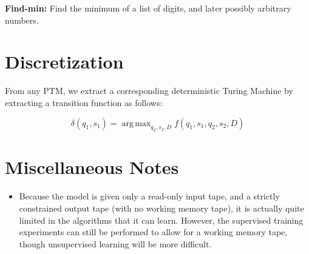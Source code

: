 \documentclass{article}
\DeclareMathOperator*{\argmax}{arg\,max}
\begin{document}
\textbf{Find-min:} Find the minimum of a list of digits, and later possibly arbitrary numbers.

\section{Discretization}
From any PTM, we extract a corresponding deterministic Turing Machine by extracting a transition function as follows:

\[ \delta(q_1, s_1) = \argmax_{q_2, s_2, D}f(q_1, s_1, q_2, s_2, D) \]

\section{Miscellaneous Notes}
\begin{itemize}
    \item Because the model is given only a read-only input tape, and a strictly constrained output tape (with no working memory tape), it is actually quite limited in the algorithms that it can learn. However, the supervised training experiments can still be performed to allow for a working memory tape, though unsupervised learning will be more difficult.
\end{itemize}
\end{document}
